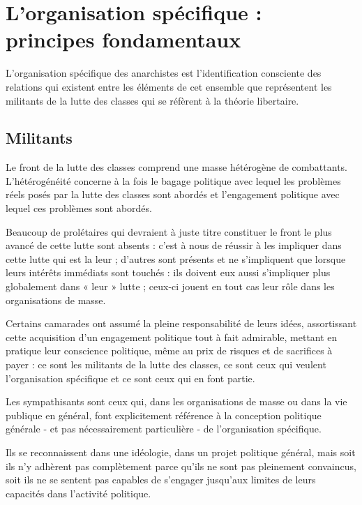 \chapter{L'organisation spécifique : principes fondamentaux}\hypertarget{lorganisation-spcifique--principes-fondamentaux}{}\label{lorganisation-spcifique--principes-fondamentaux}

L'organisation spécifique des anarchistes est l'identification consciente des relations qui existent entre les éléments de cet ensemble que représentent les militants de la lutte des classes qui se réfèrent à la théorie libertaire.

\section{Militants}\hypertarget{militants}{}\label{militants}

Le front de la lutte des classes comprend une masse hétérogène de combattants. L'hétérogénéité concerne à la fois le bagage politique avec lequel les problèmes réels posés par la lutte des classes sont abordés et l'engagement politique avec lequel ces problèmes sont abordés.

Beaucoup de prolétaires qui devraient à juste titre constituer le front le plus avancé de cette lutte sont absents : c'est à nous de réussir à les impliquer dans cette lutte qui est la leur ; d'autres sont présents et ne s'impliquent que lorsque leurs intérêts immédiats sont touchés : ils doivent eux aussi s'impliquer plus globalement dans « leur » lutte ; ceux-ci jouent en tout cas leur rôle dans les organisations de masse.

Certains camarades ont assumé la pleine responsabilité de leurs idées, assortissant cette acquisition d'un engagement politique tout à fait admirable, mettant en pratique leur conscience politique, même au prix de risques et de sacrifices à payer : ce sont les militants de la lutte des classes, ce sont ceux qui veulent l'organisation spécifique et ce sont ceux qui en font partie.

Les sympathisants sont ceux qui, dans les organisations de masse ou dans la vie publique en général, font explicitement référence à la conception politique générale - et pas nécessairement particulière - de l'organisation spécifique.

Ils se reconnaissent dans une idéologie, dans un projet politique général, mais soit ils n'y adhèrent pas complètement parce qu'ils ne sont pas pleinement convaincus, soit ils ne se sentent pas capables de s'engager jusqu'aux limites de leurs capacités dans l'activité politique.

